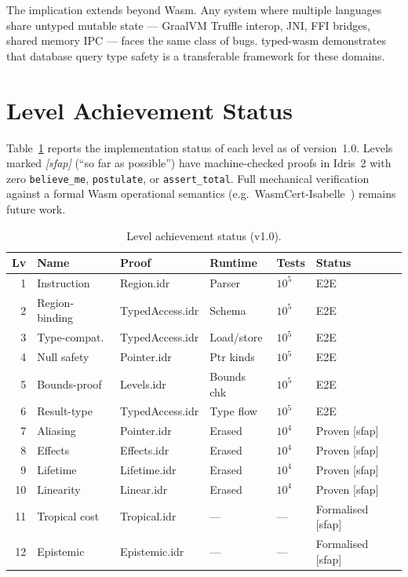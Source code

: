 \documentclass[sigplan,nonacm,screen]{acmart}
\begin{document}
The implication extends beyond Wasm. Any system where multiple languages
share untyped mutable state --- GraalVM Truffle interop, JNI, FFI bridges,
shared memory IPC --- faces the same class of bugs. typed-wasm demonstrates
that database query type safety is a transferable framework for these
domains.

\appendix
\section{Level Achievement Status}
\label{app:levels}

Table~\ref{tab:levelstatus} reports the implementation status of each
level as of version~1.0.  Levels marked \emph{[sfap]} (``so far as
possible'') have machine-checked proofs in Idris~2 with zero
\texttt{believe\_me}, \texttt{postulate}, or \texttt{assert\_total}.
Full mechanical verification against a formal Wasm operational semantics
(e.g.\ WasmCert-Isabelle~\cite{watt2018}) remains future work.

\begin{table}[ht]
\centering
\caption{Level achievement status (v1.0).}
\label{tab:levelstatus}
\begin{tabular}{@{}rlllll@{}}
\toprule
\textbf{Lv} & \textbf{Name} & \textbf{Proof} & \textbf{Runtime} & \textbf{Tests} & \textbf{Status} \\
\midrule
1  & Instruction     & Region.idr       & Parser      & $10^5$ & E2E \\
2  & Region-binding  & TypedAccess.idr  & Schema      & $10^5$ & E2E \\
3  & Type-compat.    & TypedAccess.idr  & Load/store  & $10^5$ & E2E \\
4  & Null safety     & Pointer.idr      & Ptr kinds   & $10^5$ & E2E \\
5  & Bounds-proof    & Levels.idr       & Bounds chk  & $10^5$ & E2E \\
6  & Result-type     & TypedAccess.idr  & Type flow   & $10^5$ & E2E \\
\midrule
7  & Aliasing        & Pointer.idr      & Erased      & $10^4$ & Proven [sfap] \\
8  & Effects         & Effects.idr      & Erased      & $10^4$ & Proven [sfap] \\
9  & Lifetime        & Lifetime.idr     & Erased      & $10^4$ & Proven [sfap] \\
10 & Linearity       & Linear.idr       & Erased      & $10^4$ & Proven [sfap] \\
\midrule
11 & Tropical cost   & Tropical.idr     & ---         & ---    & Formalised [sfap] \\
12 & Epistemic       & Epistemic.idr    & ---         & ---    & Formalised [sfap] \\
\bottomrule
\end{tabular}
\end{table}
\end{document}

